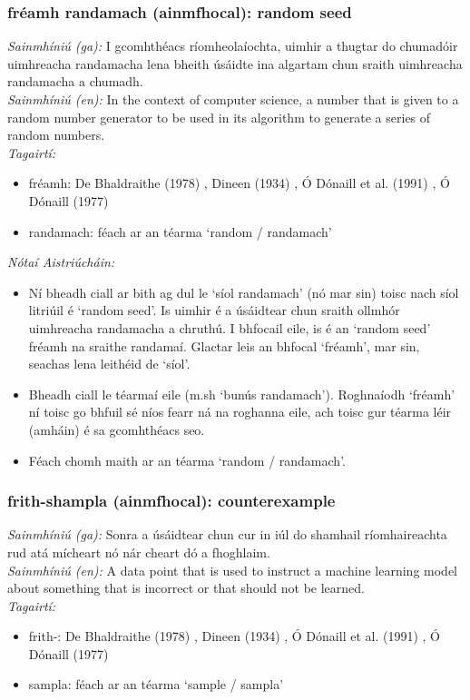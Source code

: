 \subsubsection*{fréamh randamach (ainmfhocal): random seed}
 \noindent \textit{Sainmhíniú (ga):} I gcomhthéacs ríomheolaíochta, uimhir a thugtar do chumadóir uimhreacha randamacha lena bheith úsáidte ina algartam chun sraith uimhreacha randamacha a chumadh.
\\
 \noindent \textit{Sainmhíniú (en):} In the context of computer science, a number that is given to a random number generator to be used in its algorithm to generate a series of random numbers.
\\
 \noindent \textit{Tagairtí:}
\begin{itemize}
	\item fréamh: De Bhaldraithe (1978) \cite{de-bhaldraithe}, Dineen (1934) \cite{dineen}, Ó Dónaill et al. (1991) \cite{focloir-beag}, Ó Dónaill (1977) \cite{odonaill}
	\item randamach: féach ar an téarma `random / randamach'
\end{itemize}

 \noindent \textit{Nótaí Aistriúcháin:}
\begin{itemize}
	\item Ní bheadh ciall ar bith ag dul le `síol randamach' (nó mar sin) toisc nach síol litriúil é `random seed'. Is uimhir é a úsáidtear chun sraith ollmhór uimhreacha randamacha a chruthú. I bhfocail eile, is é an `random seed' fréamh na sraithe randamaí. Glactar leis an bhfocal `fréamh', mar sin, seachas lena leithéid de `síol'.
	\item Bheadh ciall le téarmaí eile (m.sh `bunús randamach'). Roghnaíodh `fréamh' ní toisc go bhfuil sé níos fearr ná na roghanna eile, ach toisc gur téarma léir (amháin) é sa gcomhthéacs seo.
	\item Féach chomh maith ar an téarma `random / randamach'.
\end{itemize}


\subsubsection*{frith-shampla (ainmfhocal): counterexample}
 \noindent \textit{Sainmhíniú (ga):} Sonra a úsáidtear chun cur in iúl do shamhail ríomhaireachta rud atá mícheart nó nár cheart dó a fhoghlaim.
\\
 \noindent \textit{Sainmhíniú (en):} A data point that is used to instruct a machine learning model about something that is incorrect or that should not be learned.
\\
 \noindent \textit{Tagairtí:}
\begin{itemize}
	\item frith-: De Bhaldraithe (1978) \cite{de-bhaldraithe}, Dineen (1934) \cite{dineen}, Ó Dónaill et al. (1991) \cite{focloir-beag}, Ó Dónaill (1977) \cite{odonaill}
	\item sampla: féach ar an téarma `sample / sampla'
\end{itemize}

